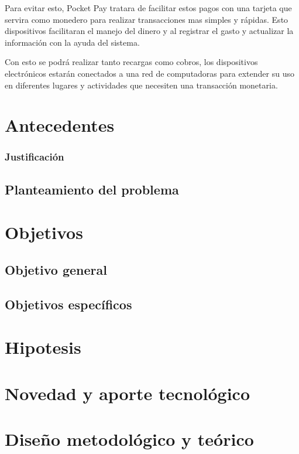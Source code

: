 \documentclass{sig-alternate}
\begin{document}
Para evitar esto, Pocket Pay tratara de facilitar estos pagos 
con una tarjeta que servira como monedero para realizar 
transacciones mas simples y r\'apidas. Esto dispositivos facilitaran 
el manejo del dinero y al registrar el gasto y actualizar la informaci\'on
 con la ayuda del sistema.
 
 Con esto se podr\'a realizar tanto recargas como cobros, los dispositivos 
electr\'onicos estar\'an conectados a una red de computadoras 
para extender su uso en diferentes lugares y actividades que necesiten una transacci\'on monetaria.

\section{Antecedentes}


\subsubsection{Justificaci\'on}

\subsection{Planteamiento del problema}

\section{Objetivos}

\subsection{Objetivo general}
\subsection{Objetivos espec\'ificos}

\section{Hipotesis}

\section{Novedad y aporte tecnol\'ogico}

\section{Dise\~no metodol\'ogico y te\'orico}
\end{document}
